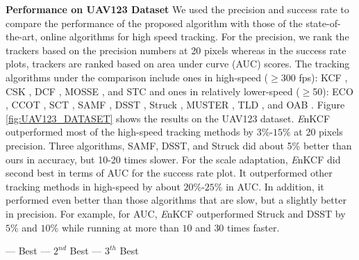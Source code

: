 \documentclass[10pt,twocolumn,letterpaper]{article}
\begin{document}
\textbf{Performance on UAV123 Dataset} We used the precision and
success rate to compare the performance of the proposed algorithm with
those of the state-of-the-art, online algorithms for high speed
tracking. For the precision, we rank the trackers based on the
precision numbers at 20 pixels whereas in the success rate plots,
trackers are ranked based on area under curve (AUC) scores. The
tracking algorithms under the comparison include ones in high-speed
($\geq$300 fps): KCF \cite{henriques2015high}, CSK
\cite{henriques2012exploiting}, DCF \cite{henriques2015high}, MOSSE
\cite{bolme2010visual}, and STC \cite{zhang2014fast}
and ones in relatively lower-speed ($\geq$50): ECO \cite{DanelljanCVPR2017}, 
CCOT \cite{DanelljanECCV2016}, SCT \cite{Choi_2016_CVPR}, SAMF
\cite{li2014scale}, DSST \cite{danelljan2014accurate}, Struck
\cite{hare2012efficient}, MUSTER \cite{hong2015multi}, TLD
\cite{kalal2012tracking}, and OAB \cite{zhang2012robust}. Figure
\ref{fig:UAV123_DATASET} shows the results on the UAV123 dataset. {\it
  E}nKCF outperformed most of the high-speed tracking methods by
$3\%$-$15\%$ at 20 pixels precision. Three algorithms, SAMF, DSST, and
Struck did about 5\% better than ours in accuracy, but 10-20 times
slower. For the scale adaptation, {\it E}nKCF did second best in terms
of AUC for the success rate plot. It outperformed other tracking
methods in high-speed by about $20\%$-$25\%$ in AUC. In addition, it
performed even better than those algorithms that are slow, but a
slightly better in precision. For example, for AUC, {\it E}nKCF
outperformed Struck and DSST by $5\%$ and $10\%$ while running at more
than $10$ and $30$ times faster.

\begin{table}[!h]
\smaller
\begin{center}
\color{green}--- Best \hspace{.15\linewidth}\color{red}--- $2^{nd}$ Best \hspace{.15\linewidth}\color{blue}--- $3^{th}$ Best \color{black}\\
\end{center}
\caption{Results of running different combinations of the KCFs for
  UAV123 dataset.  The '$*$' represents
  sequential approach where multiple KCFs are run in the given order in every frame as in LCT \cite{ma2015long}.}
\label{table:Comparison_to_LCT}
\end{table}
\end{document}
